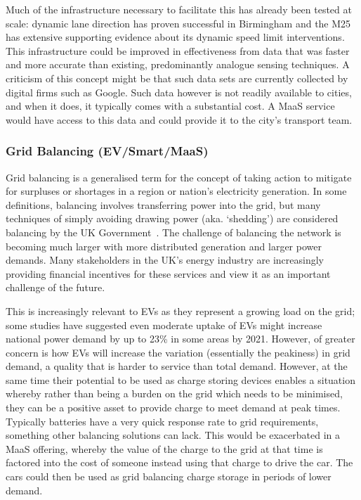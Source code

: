 \documentclass[journal]{IEEEtran}
\begin{document}
Much of the infrastructure necessary to facilitate this has already
been tested at scale: dynamic lane direction has proven successful in
Birmingham and the M25 has extensive supporting evidence about its
dynamic speed limit interventions. This infrastructure could be
improved in effectiveness from data that was faster and more accurate
than existing, predominantly analogue sensing techniques.  A criticism
of this concept might be that such data sets are currently collected
by digital firms such as Google. Such data however is not readily
available to cities, and when it does, it typically comes with a
substantial cost. A MaaS service would have access to this data
and could provide it to the city's transport team.


\subsubsection{Grid Balancing (EV/Smart/MaaS)} 

Grid balancing is a generalised term for the concept of taking action
to mitigate for surpluses or shortages in a region or nation’s
electricity generation. In some definitions, balancing involves
transferring power into the grid, but many techniques of simply
avoiding drawing power (aka. `shedding') are considered balancing by
the UK Government~\cite{decc:2014}. The challenge of balancing the
network is becoming much larger with more distributed generation and
larger power demands. Many stakeholders in the UK's energy industry
are increasingly providing financial incentives for these services and
view it as an important challenge of the future.

This is increasingly relevant to EVs as they represent a growing load
on the grid; some studies have suggested even moderate uptake of EVs
might increase national power demand by up to 23\% in some areas by
2021. However, of greater concern is how EVs will increase the
variation (essentially the peakiness) in grid demand, a quality that
is harder to service than total demand. However, at the same time
their potential to be used as charge storing devices enables a
situation whereby rather than being a burden on the grid which needs
to be minimised, they can be a positive asset to provide charge to
meet demand at peak times. Typically batteries have a very quick
response rate to grid requirements, something other balancing
solutions can lack. This would be exacerbated in a MaaS offering,
whereby the value of the charge to the grid at that time is factored
into the cost of someone instead using that charge to drive the
car. The cars could then be used as grid balancing charge storage in
periods of lower demand.
\end{document}
